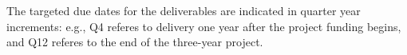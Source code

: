 \lipsum[131]
The targeted due dates for the deliverables are indicated in quarter year
increments: e.g., Q4 referes to delivery one year after the project funding
begins, and Q12 referes to the end of the three-year project.



\renewcommand{\labelenumii}{\arabic{enumi}.\arabic{enumii}}
\renewcommand{\labelenumiii}{\arabic{enumi}.\arabic{enumii}.\arabic{enumiii}}
\renewcommand{\labelenumiv}{\arabic{enumi}.\arabic{enumii}.\arabic{enumiii}.\arabic{enumiv}}

\begin{enumerate}
\setcounter{enumi}{1} %


\end{enumerate}
